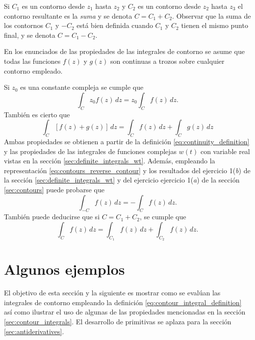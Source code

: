 \documentclass[a4paper]{report}
\begin{document}
Si \(C_1\) es un contorno desde \(z_1\) hasta \(z_2\) y \(C_2\) es un contorno desde \(z_2\) hasta \(z_3\) el contorno resultante es la \emph{suma} y se denota \(C=C_1+C_2\). Observar que la suma de los contornos \(C_1\) y \(-C_2\) está bien definida cuando \(C_1\) y \(C_2\) tienen el mismo punto final, y se denota \(C=C_1-C_2\).

En los enunciados de las propiedades de las integrales de contorno se asume que todas las funciones \(f(z)\) y \(g(z)\) son continuas a trozos sobre cualquier contorno empleado.

Si \(z_0\) es una constante compleja se cumple que 
\[
 \int_C z_0f(z)\,dz= z_0\int_C f(z)\,dz.
\]
También es cierto que 
\[
 \int_C[f(z)+g(z)]\,dz=\int_C f(z)\,dz+\int_C g(z)\,dz
\]
Ambas propiedades se obtienen a partir de la definición \ref{eq:continuity_definition} y las propiedades de las integrales de funciones complejas \(w(t)\) con variable real vistas en la sección \ref{sec:definite_integrals_wt}. Además, empleando la representación \ref{eq:contours_reverse_contour} y los resultados del ejercicio 1(\textit{b}) de la sección \ref{sec:definite_integrals_wt} y del ejercicio ejercicio 1(\textit{a}) de la sección \ref{sec:contours} puede probarse que 
\[
 \int_{-C}f(z)\,dz= -\int_C f(z)\,dz.
\]
También puede deducirse que si \(C=C_1+C_2\), se cumple que
\[
 \int_{C}f(z)\,dz=\int_{C_1}f(z)\,dz+\int_{C_2}f(z)\,dz.
\]

\section{Algunos ejemplos}\label{sec:contour_integrals_examples}

El objetivo de esta sección y la siguiente es mostrar como se evalúan las integrales de contorno empleando la definición \ref{eq:contour_integral_definition} así como ilustrar el uso de algunas de las propiedades mencionadas en la sección \ref{sec:contour_integrals}. El desarrollo de primitivas se aplaza para la sección \ref{sec:antiderivatives}.
\end{document}
